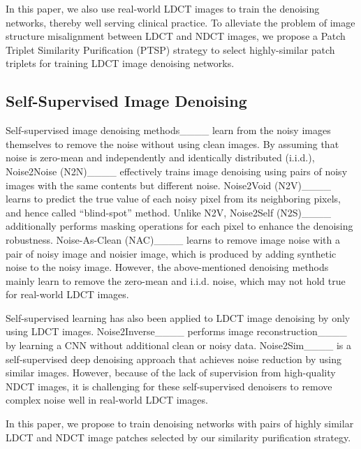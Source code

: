 In this paper, we also use real-world LDCT images to train the denoising networks, thereby well serving clinical practice. To alleviate the problem of image structure misalignment between LDCT and NDCT images, we propose a Patch Triplet Similarity Purification (PTSP) strategy to select highly-similar patch triplets for training LDCT image denoising networks.

\subsection{Self-Supervised Image Denoising}
\label{subsec:unpaired}
Self-supervised image denoising methods____ learn from the noisy images themselves to remove the noise without using clean images.
%
By assuming that noise is zero-mean and independently and identically distributed (i.i.d.), Noise2Noise (N2N)____ effectively trains image denoising using pairs of noisy images with the same contents but different noise. Noise2Void (N2V)____ learns to predict the true value of each noisy pixel from its neighboring pixels, and hence called ``blind-spot'' method.
Unlike N2V, Noise2Self (N2S)____ additionally performs masking operations for each pixel to enhance the denoising robustness.
%
Noise-As-Clean (NAC)____ learns to remove image noise with a pair of noisy image and noisier image, which is produced by adding synthetic noise to the noisy image.
%
However, the above-mentioned denoising methods mainly learn to remove the zero-mean and i.i.d. noise, which may not hold true for real-world LDCT images.

Self-supervised learning has also been applied to LDCT image denoising by only using LDCT images.
Noise2Inverse____ performs image reconstruction____ by learning a CNN without additional clean or noisy data.
Noise2Sim____ is a self-supervised deep denoising approach that achieves noise reduction by using similar images.
%
However, because of the lack of supervision from high-quality NDCT images, it is challenging for these self-supervised denoisers to remove complex noise well in real-world LDCT images.


In this paper,
we propose to train denoising networks with pairs of highly similar LDCT and NDCT image patches selected by our similarity purification strategy.

